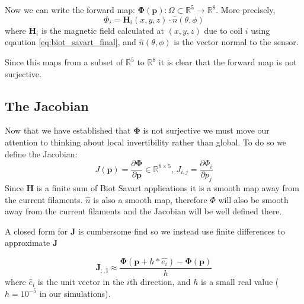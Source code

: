 \documentclass[12pt,a4paper]{report}
\begin{document}
Now we can write the forward map: $\mathbf{\Phi}(\mathbf{p}): \Omega \subset \mathbb{R}^5 \rightarrow \mathbb{R}^8$. More precisely,
\begin{equation}
  \Phi_i = \mathbf{H}_i(x,y,z) \cdot \hat{n}(\theta,\phi) 
\end{equation}
where $\mathbf{H}_i$ is the magnetic field calculated at $(x,y,z)$ due to coil $i$ using eqaution \eqref{eq:biot_savart_final}, and $\hat{n}(\theta,\phi)$ is the vector normal to the sensor.

Since this maps from a subset of $\mathbb{R}^5$ to $\mathbb{R}^8$ it is clear that the forward map is not surjective.

\subsection{The Jacobian}
Now that we have established that $\mathbf{\Phi}$ is not surjective we must move our attention to thinking about local invertibility rather than global. To do so we define the Jacobian:
\begin{equation}
  J(\mathbf{p}) = \frac{\partial \mathbf{\Phi}}{\partial \mathbf{p}} \in \mathbb{R}^{8\times5} \text{, } J_{i,j} = \frac{\partial \Phi_i}{\partial p_j}
  \label{eq:}
\end{equation}
Since $\mathbf{H}$ is a finite sum of Biot Savart applications it is a smooth map away from the current filaments. $\hat{n}$ is also a smooth map, therefore $\Phi$ will also be smooth away from the current filaments and the Jacobian will be well defined there.

A closed form for $\mathbf{J}$ is cumbersome find so we instead use finite differences to approximate $\mathbf{J}$

\begin{equation}
  \mathbf{J_{:,i}} \approx \frac{\mathbf{\Phi}\left(\mathbf{p} + h * \hat{e_i} \right) - \mathbf{\Phi(\mathbf{p})}}{h}
  \label{eq:}
\end{equation}
where $\hat{e}_i$ is the unit vector in the $i$th direction, and $h$ is a small real value ($h = 10^{-5}$ in our simulations).
\end{document}
